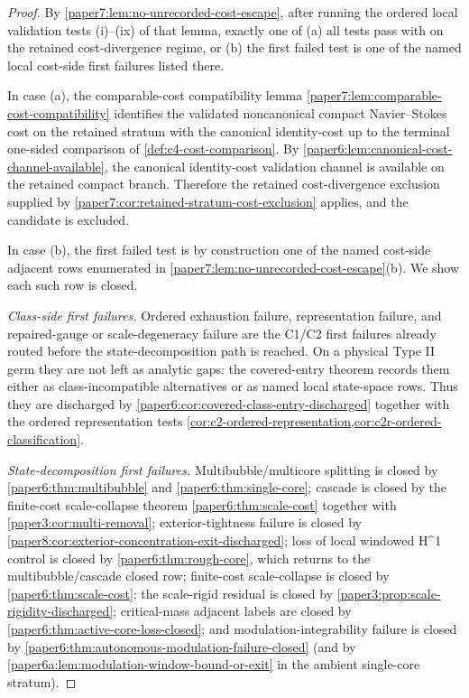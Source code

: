 \documentclass[11pt]{amsart}
\def\({}%
\def\){}%
\theoremstyle{plain}
\theoremstyle{definition}
\theoremstyle{remark}
\begin{document}
\begin{proof}
By \cref{paper7:lem:no-unrecorded-cost-escape}, after running the ordered
local validation tests \textup{(i)}--\textup{(ix)} of that lemma, exactly
one of \textup{(a)} all tests pass with \(\omega\) on the retained
cost-divergence regime, or \textup{(b)} the first failed test is one of the
named local cost-side first failures listed there.

In case \textup{(a)}, the comparable-cost compatibility lemma
\cref{paper7:lem:comparable-cost-compatibility} identifies the validated
noncanonical compact Navier--Stokes cost on the retained stratum with the
canonical identity-cost up to the terminal one-sided comparison of
\cref{def:c4-cost-comparison}.  By
\cref{paper6:lem:canonical-cost-channel-available}, the canonical identity-cost
validation channel is available on the retained compact branch.  Therefore the retained cost-divergence
exclusion supplied by
\cref{paper7:cor:retained-stratum-cost-exclusion} applies, and the candidate
is excluded.

In case \textup{(b)}, the first failed test is by construction one of the
named cost-side adjacent rows enumerated in
\cref{paper7:lem:no-unrecorded-cost-escape}\textup{(b)}.  We show each
such row is closed.

\smallskip\noindent\emph{Class-side first failures.}  Ordered exhaustion
failure, representation failure, and repaired-gauge or scale-degeneracy
failure are the C1/C2 first failures already routed before the
state-decomposition path is reached.  On a physical Type II germ they are not
left as analytic gaps: the covered-entry theorem records them either as
class-incompatible alternatives or as named local state-space rows.  Thus they
are discharged by \cref{paper6:cor:covered-class-entry-discharged} together
with the ordered representation tests
\cref{cor:c2-ordered-representation,cor:c2r-ordered-classification}.

\smallskip\noindent\emph{State-decomposition first failures.}
Multibubble/multicore splitting is closed by \cref{paper6:thm:multibubble}
and \cref{paper6:thm:single-core}; cascade is closed by the finite-cost
scale-collapse theorem \cref{paper6:thm:scale-cost} together with
\cref{paper3:cor:multi-removal}; exterior-tightness failure is closed by
\cref{paper8:cor:exterior-concentration-exit-discharged}; loss of local
windowed \(H^1\) control is closed by \cref{paper6:thm:rough-core}, which
returns to the multibubble/cascade closed row; finite-cost scale-collapse
is closed by \cref{paper6:thm:scale-cost}; the scale-rigid residual is
closed by \cref{paper3:prop:scale-rigidity-discharged}; critical-mass
adjacent labels are closed by
\cref{paper6:thm:active-core-loss-closed}; and modulation-integrability
failure is closed by
\cref{paper6:thm:autonomous-modulation-failure-closed} (and by
\cref{paper6a:lem:modulation-window-bound-or-exit} in the ambient
single-core stratum).


\end{proof}
\end{document}
